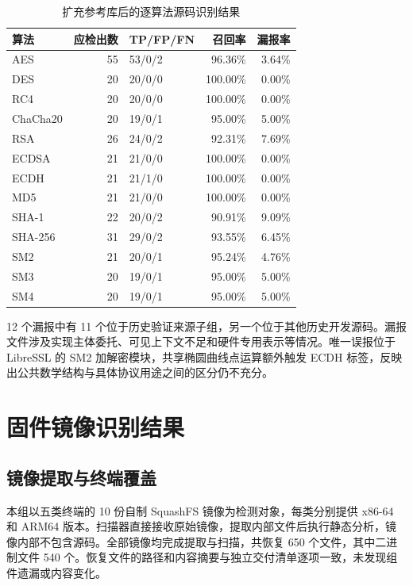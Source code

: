 \begin{table}[H]\centering\small
\caption{扩充参考库后的逐算法源码识别结果}
\label{tab:expanded-source-algorithms}
\begin{tabularx}{\linewidth}{@{}Xrlrr@{}}\toprule
算法 & 应检出数 & TP/FP/FN & 召回率 & 漏报率\\\midrule
AES & 55 & 53/0/2 & 96.36\% & 3.64\%\\
DES & 20 & 20/0/0 & 100.00\% & 0.00\%\\
RC4 & 20 & 20/0/0 & 100.00\% & 0.00\%\\
ChaCha20 & 20 & 19/0/1 & 95.00\% & 5.00\%\\
RSA & 26 & 24/0/2 & 92.31\% & 7.69\%\\
ECDSA & 21 & 21/0/0 & 100.00\% & 0.00\%\\
ECDH & 21 & 21/1/0 & 100.00\% & 0.00\%\\
MD5 & 21 & 21/0/0 & 100.00\% & 0.00\%\\
SHA-1 & 22 & 20/0/2 & 90.91\% & 9.09\%\\
SHA-256 & 31 & 29/0/2 & 93.55\% & 6.45\%\\
SM2 & 21 & 20/0/1 & 95.24\% & 4.76\%\\
SM3 & 20 & 19/0/1 & 95.00\% & 5.00\%\\
SM4 & 20 & 19/0/1 & 95.00\% & 5.00\%\\\bottomrule
\end{tabularx}
\end{table}

12 个漏报中有 11 个位于历史验证来源子组，另一个位于其他历史开发源码。漏报文件涉及实现主体委托、可见上下文不足和硬件专用表示等情况。唯一误报位于 LibreSSL 的 SM2 加解密模块，共享椭圆曲线点运算额外触发 ECDH 标签，反映出公共数学结构与具体协议用途之间的区分仍不充分。

\section{固件镜像识别结果}
\label{sec:firmware-results}

\subsection{镜像提取与终端覆盖}

本组以五类终端的 10 份自制 SquashFS 镜像为检测对象，每类分别提供 x86-64 和 ARM64 版本。扫描器直接接收原始镜像，提取内部文件后执行静态分析，镜像内部不包含源码。全部镜像均完成提取与扫描，共恢复 650 个文件，其中二进制文件 540 个。恢复文件的路径和内容摘要与独立交付清单逐项一致，未发现组件遗漏或内容变化。

